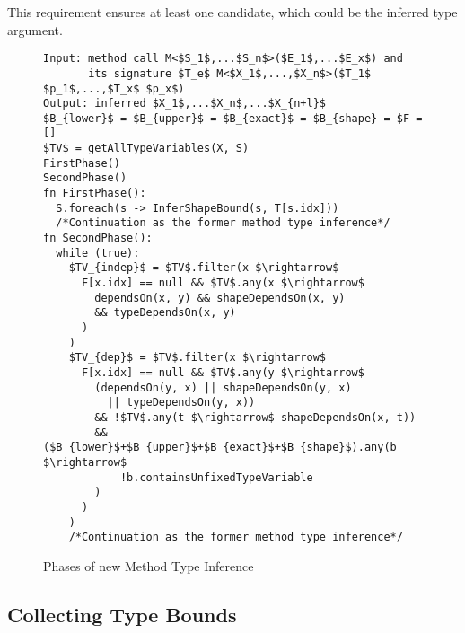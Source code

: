 This requirement ensures at least one candidate, which could be the inferred type argument.
\begin{figure}[h!]
\begin{lstlisting}[style=myAlgo, mathescape=true]
Input: method call M<$S_1$,...$S_n$>($E_1$,...$E_x$) and 
       its signature $T_e$ M<$X_1$,...,$X_n$>($T_1$ $p_1$,...,$T_x$ $p_x$)
Output: inferred $X_1$,...$X_n$,...$X_{n+l}$
$B_{lower}$ = $B_{upper}$ = $B_{exact}$ = $B_{shape} = $F = []
$TV$ = getAllTypeVariables(X, S)
FirstPhase()
SecondPhase()
fn FirstPhase():
  S.foreach(s -> InferShapeBound(s, T[s.idx]))
  /*Continuation as the former method type inference*/
fn SecondPhase():
  while (true):
    $TV_{indep}$ = $TV$.filter(x $\rightarrow$ 
      F[x.idx] == null && $TV$.any(x $\rightarrow$ 
        dependsOn(x, y) && shapeDependsOn(x, y) 
        && typeDependsOn(x, y)
      )
    )
    $TV_{dep}$ = $TV$.filter(x $\rightarrow$
      F[x.idx] == null && $TV$.any(y $\rightarrow$ 
        (dependsOn(y, x) || shapeDependsOn(y, x) 
          || typeDependsOn(y, x)) 
        && !$TV$.any(t $\rightarrow$ shapeDependsOn(x, t))
        && ($B_{lower}$+$B_{upper}$+$B_{exact}$+$B_{shape}$).any(b $\rightarrow$ 
            !b.containsUnfixedTypeVariable
        )
      )
    )
    /*Continuation as the former method type inference*/
\end{lstlisting}
\caption{Phases of new Method Type Inference}
\label{img54:mainTypeInference1}
\end{figure}

\newpage

\subsection{Collecting Type Bounds}

